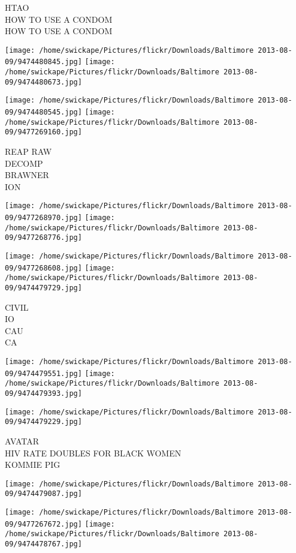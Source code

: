 \documentclass[10pt,letterpaper]{article}
\begin{document}
HTAO\\
HOW TO USE A CONDOM\\
HOW TO USE A CONDOM
\pagebreak

\texttt{[image: /home/swickape/Pictures/flickr/Downloads/Baltimore 2013-08-09/9474480845.jpg]}
\texttt{[image: /home/swickape/Pictures/flickr/Downloads/Baltimore 2013-08-09/9474480673.jpg]}

\texttt{[image: /home/swickape/Pictures/flickr/Downloads/Baltimore 2013-08-09/9474480545.jpg]}
\texttt{[image: /home/swickape/Pictures/flickr/Downloads/Baltimore 2013-08-09/9477269160.jpg]}

REAP RAW\\
DECOMP\\
BRAWNER\\
ION
\pagebreak

\texttt{[image: /home/swickape/Pictures/flickr/Downloads/Baltimore 2013-08-09/9477268970.jpg]}
\texttt{[image: /home/swickape/Pictures/flickr/Downloads/Baltimore 2013-08-09/9477268776.jpg]}

\texttt{[image: /home/swickape/Pictures/flickr/Downloads/Baltimore 2013-08-09/9477268608.jpg]}
\texttt{[image: /home/swickape/Pictures/flickr/Downloads/Baltimore 2013-08-09/9474479729.jpg]}

CIVIL\\
IO\\
CAU\\
CA
\pagebreak

\texttt{[image: /home/swickape/Pictures/flickr/Downloads/Baltimore 2013-08-09/9474479551.jpg]}
\texttt{[image: /home/swickape/Pictures/flickr/Downloads/Baltimore 2013-08-09/9474479393.jpg]}

\texttt{[image: /home/swickape/Pictures/flickr/Downloads/Baltimore 2013-08-09/9474479229.jpg]}

AVATAR\\
HIV RATE DOUBLES FOR BLACK WOMEN\\
KOMMIE PIG
\pagebreak

\texttt{[image: /home/swickape/Pictures/flickr/Downloads/Baltimore 2013-08-09/9474479087.jpg]}

\vspace{0.25in}
\texttt{[image: /home/swickape/Pictures/flickr/Downloads/Baltimore 2013-08-09/9477267672.jpg]}
\texttt{[image: /home/swickape/Pictures/flickr/Downloads/Baltimore 2013-08-09/9474478767.jpg]}
\end{document}
